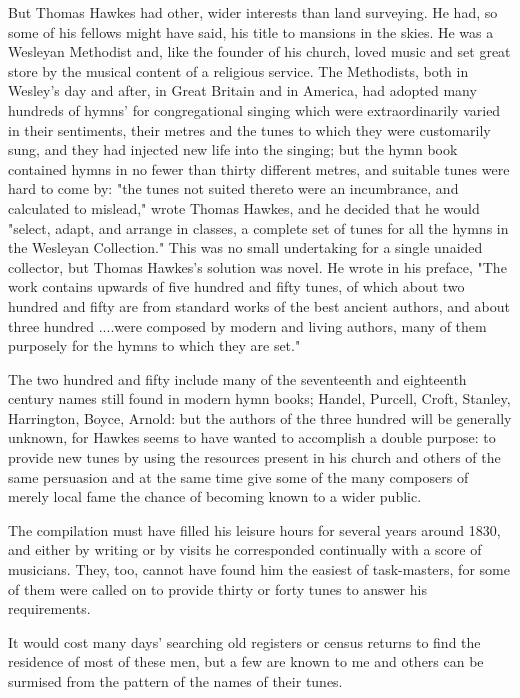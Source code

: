 But Thomas Hawkes had other, wider interests than land surveying. He had, so some of his fellows might have said, his title to mansions in the skies. He was a Wesleyan Methodist and, like the founder of his church, loved music and set great store by the musical content of a religious service. The Methodists, both in Wesley's day and after, in Great Britain and in America, had adopted many hundreds of hymns' for congregational singing which were extraordinarily varied in their sentiments, their metres and the tunes to which they were customarily sung, and they had injected new life into the singing; but the hymn book contained hymns in no fewer than thirty different metres, and suitable tunes were hard to come by: "the tunes not suited thereto were an incumbrance, and calculated to mislead," wrote Thomas Hawkes, and he decided that he would "select, adapt, and arrange in classes, a complete set of tunes for all the hymns in the Wesleyan Collection." This was no small undertaking for a single unaided collector, but Thomas Hawkes's solution was novel. He wrote in his preface, "The work contains upwards of five hundred and fifty tunes, of which about two hundred and fifty are from standard works of the best ancient authors, and about three hundred ....were composed by modern and living authors, many of them purposely for the hymns to which they are set."

The two hundred and fifty include many of the seventeenth and eighteenth century names still found in modern hymn books; Handel, Purcell, Croft, Stanley, Harrington, Boyce, Arnold: but the authors of the three hundred will be generally unknown, for Hawkes seems to have wanted to accomplish a double purpose: to provide new tunes by using the resources present in his church and others of the same persuasion and at the same time give some of the many composers of merely local fame the chance of becoming known to a wider public.
 
The compilation must have filled his leisure hours for several years around 1830, and either by writing or by visits he corresponded continually with a score of musicians. They, too, cannot have found him the easiest of task-masters, for some of them were called on to provide thirty or forty tunes to answer his requirements.

It would cost many days' searching old registers or census returns to find the residence of most of these men, but a few are known to me and others can be surmised from the pattern of the names of their tunes.

